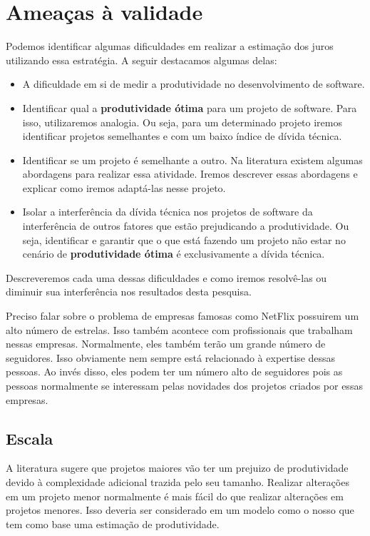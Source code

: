 \chapter{Ameaças à validade}

Podemos identificar algumas dificuldades em realizar a estimação dos juros utilizando essa estratégia. A seguir destacamos algumas delas:
 
 \begin{itemize}
 \item A dificuldade em si de medir a produtividade no desenvolvimento de software.
 \item Identificar qual a \textbf{produtividade ótima} para um projeto de software. Para isso, utilizaremos analogia. Ou seja, para um determinado projeto iremos identificar projetos semelhantes e com um baixo índice de dívida técnica.
 \item Identificar se um projeto é semelhante a outro. Na literatura existem algumas abordagens para realizar essa atividade. Iremos descrever essas abordagens e explicar como iremos adaptá-las nesse projeto.
 \item Isolar a interferência da dívida técnica nos projetos de software da interferência de outros fatores que estão prejudicando a produtividade. Ou seja, identificar e garantir que o que está fazendo um projeto não estar no cenário de \textbf{produtividade ótima} é exclusivamente a dívida técnica.
 \end{itemize}
 
 Descreveremos cada uma dessas dificuldades e como iremos resolvê-las ou diminuir sua interferência nos resultados desta pesquisa.
 
 
 Preciso falar sobre o problema de empresas famosas como NetFlix possuirem um alto número de estrelas. Isso também acontece com profissionais que trabalham nessas empresas. Normalmente, eles também terão um grande número de seguidores. Isso obviamente nem sempre está relacionado à expertise dessas pessoas. Ao invés disso, eles podem ter um número alto de seguidores pois as pessoas normalmente se interessam pelas novidades dos projetos criados por essas empresas. 
 
 \section{Escala}

A literatura sugere que projetos maiores vão ter um prejuizo de produtividade devido à complexidade adicional trazida pelo seu tamanho. Realizar alterações em um projeto menor normalmente é mais fácil do que realizar alterações em projetos menores. Isso deveria ser considerado em um modelo como o nosso que tem como base uma estimação de produtividade.

